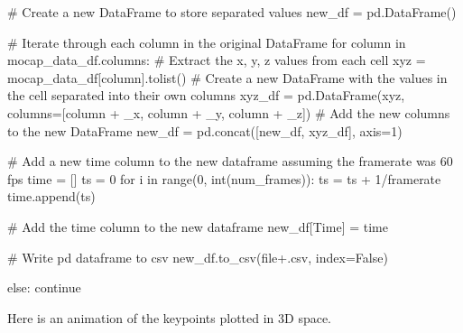 \documentclass[
  letterpaper,
  DIV=11,
  numbers=noendperiod]{scrreprt}
\newenvironment{Shaded}{\begin{snugshade}}{\end{snugshade}}
\newcommand{\BuiltInTok}[1]{\textcolor[rgb]{0.00,0.23,0.31}{#1}}
\newcommand{\CommentTok}[1]{\textcolor[rgb]{0.37,0.37,0.37}{#1}}
\newcommand{\ControlFlowTok}[1]{\textcolor[rgb]{0.00,0.23,0.31}{#1}}
\newcommand{\DecValTok}[1]{\textcolor[rgb]{0.68,0.00,0.00}{#1}}
\newcommand{\KeywordTok}[1]{\textcolor[rgb]{0.00,0.23,0.31}{#1}}
\newcommand{\NormalTok}[1]{\textcolor[rgb]{0.00,0.23,0.31}{#1}}
\newcommand{\OperatorTok}[1]{\textcolor[rgb]{0.37,0.37,0.37}{#1}}
\newcommand{\StringTok}[1]{\textcolor[rgb]{0.13,0.47,0.30}{#1}}
\newcommand{\VariableTok}[1]{\textcolor[rgb]{0.07,0.07,0.07}{#1}}
\begin{document}
\begin{Shaded}
\begin{Highlighting}[]
        \CommentTok{\# Create a new DataFrame to store separated values}
\NormalTok{        new\_df }\OperatorTok{=}\NormalTok{ pd.DataFrame()}

        \CommentTok{\# Iterate through each column in the original DataFrame}
        \ControlFlowTok{for}\NormalTok{ column }\KeywordTok{in}\NormalTok{ mocap\_data\_df.columns:}
            \CommentTok{\# Extract the x, y, z values from each cell}
\NormalTok{            xyz }\OperatorTok{=}\NormalTok{ mocap\_data\_df[column].tolist()}
            \CommentTok{\# Create a new DataFrame with the values in the cell separated into their own columns}
\NormalTok{            xyz\_df }\OperatorTok{=}\NormalTok{ pd.DataFrame(xyz, columns}\OperatorTok{=}\NormalTok{[column }\OperatorTok{+} \StringTok{\textquotesingle{}\_x\textquotesingle{}}\NormalTok{, column }\OperatorTok{+} \StringTok{\textquotesingle{}\_y\textquotesingle{}}\NormalTok{, column }\OperatorTok{+} \StringTok{\textquotesingle{}\_z\textquotesingle{}}\NormalTok{])}
            \CommentTok{\# Add the new columns to the new DataFrame}
\NormalTok{            new\_df }\OperatorTok{=}\NormalTok{ pd.concat([new\_df, xyz\_df], axis}\OperatorTok{=}\DecValTok{1}\NormalTok{)}

        \CommentTok{\# Add a new time column to the new dataframe assuming the framerate was 60 fps}
\NormalTok{        time }\OperatorTok{=}\NormalTok{ []}
\NormalTok{        ts }\OperatorTok{=} \DecValTok{0}
        \ControlFlowTok{for}\NormalTok{ i }\KeywordTok{in} \BuiltInTok{range}\NormalTok{(}\DecValTok{0}\NormalTok{, }\BuiltInTok{int}\NormalTok{(num\_frames)):}
\NormalTok{            ts }\OperatorTok{=}\NormalTok{ ts }\OperatorTok{+} \DecValTok{1}\OperatorTok{/}\NormalTok{framerate}
\NormalTok{            time.append(ts)}

        \CommentTok{\# Add the time column to the new dataframe}
\NormalTok{        new\_df[}\StringTok{\textquotesingle{}Time\textquotesingle{}}\NormalTok{] }\OperatorTok{=}\NormalTok{ time}

        \CommentTok{\# Write pd dataframe to csv}
\NormalTok{        new\_df.to\_csv(}\BuiltInTok{file}\OperatorTok{+}\StringTok{\textquotesingle{}.csv\textquotesingle{}}\NormalTok{, index}\OperatorTok{=}\VariableTok{False}\NormalTok{)}

    \ControlFlowTok{else}\NormalTok{:}
        \ControlFlowTok{continue}
\end{Highlighting}
\end{Shaded}

Here is an animation of the keypoints plotted in 3D space.
\end{document}
